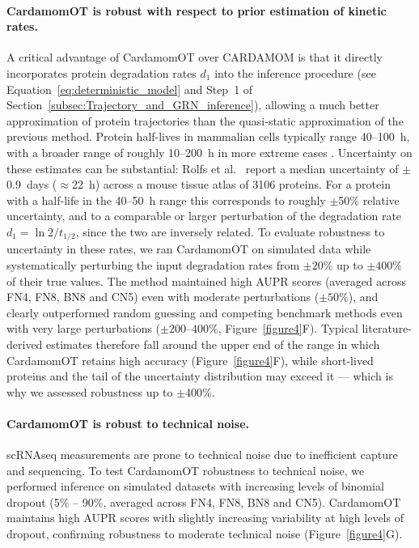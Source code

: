 \documentclass[a4paper, 11pt]{article}
\theoremstyle{plain}
\theoremstyle{remark}
\newcommand*{\firstreview}[1]{{\color{black}#1}}
\begin{document}
\paragraph{CardamomOT is robust with respect to prior estimation of kinetic rates.}
A critical advantage of CardamomOT over CARDAMOM is that it directly incorporates protein degradation rates $d_1$ into the inference procedure (see Equation~\eqref{eq:deterministic_model} and Step~1 of Section~\ref{subsec:Trajectory_and_GRN_inference}), allowing a much better approximation of protein trajectories than the quasi-static approximation of the previous method.
\firstreview{Protein half-lives in mammalian cells typically range 40--100~h, with a broader
range of roughly 10--200~h in more extreme cases \cite{Dear2024, schwanhausser2011global}.
Uncertainty on these estimates can be substantial: Rolfs et al.\ \cite{Rolfs2021} report a
median uncertainty of $\pm$0.9~days ($\approx$22~h) across a mouse tissue atlas of 3106
proteins. For a protein with a half-life in the 40--50~h range this corresponds to roughly
$\pm$50\% relative uncertainty, and to a comparable or larger perturbation of the degradation
rate $d_1 = \ln 2 / t_{1/2}$, since the two are inversely related. To evaluate robustness to uncertainty in these rates, we ran CardamomOT on simulated data while systematically perturbing the input degradation rates from $\pm 20\%$ up to $\pm 400\%$ of their true values. The method maintained high AUPR scores (averaged across FN4, FN8, BN8 and CN5) even with moderate perturbations ($\pm 50\%$), and clearly outperformed random guessing and competing benchmark methods even with very large perturbations ($\pm 200$--$400\%$, Figure~\ref{figure4}F).
Typical literature-derived
estimates therefore fall around the upper end of the range in which CardamomOT retains high
accuracy (Figure~\ref{figure4}F), while short-lived proteins and the tail of the uncertainty
distribution may exceed it --- which is why we assessed robustness up to $\pm$400\%.}


\firstreview{
\paragraph{CardamomOT is robust to technical noise.}
scRNAseq measurements are prone to technical noise due to inefficient capture and sequencing. To test CardamomOT robustness to technical noise, we performed inference on simulated datasets with increasing levels of binomial dropout (5\% -- 90\%, averaged across FN4, FN8, BN8 and CN5). CardamomOT maintains high AUPR scores with slightly increasing variability at high levels of dropout, confirming robustness to moderate technical noise (Figure~\ref{figure4}G). 
}
\end{document}
